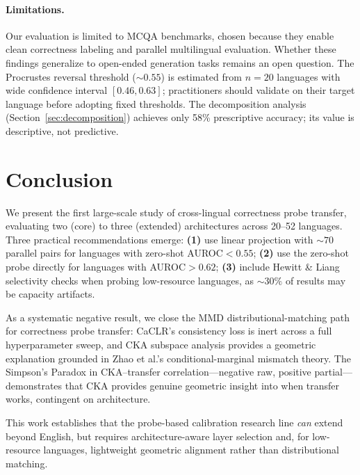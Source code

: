 \documentclass[11pt,a4paper]{article}
\newcommand{\auroc}{AUROC}
\begin{document}
\paragraph{Limitations.}
Our evaluation is limited to MCQA benchmarks, chosen because they enable clean correctness labeling and parallel multilingual evaluation. Whether these findings generalize to open-ended generation tasks remains an open question. The Procrustes reversal threshold (${\sim}0.55$) is estimated from $n=20$ languages with wide confidence interval $[0.46, 0.63]$; practitioners should validate on their target language before adopting fixed thresholds. The decomposition analysis (Section~\ref{sec:decomposition}) achieves only 58\% prescriptive accuracy; its value is descriptive, not predictive.


\section{Conclusion}

We present the first large-scale study of cross-lingual correctness probe transfer, evaluating two (core) to three (extended) architectures across 20--52 languages. Three practical recommendations emerge: \textbf{(1)} use linear projection with ${\sim}70$ parallel pairs for languages with zero-shot \auroc{}$<0.55$; \textbf{(2)} use the zero-shot probe directly for languages with \auroc{}$>0.62$; \textbf{(3)} include Hewitt \& Liang selectivity checks when probing low-resource languages, as ${\sim}30\%$ of results may be capacity artifacts.

As a systematic negative result, we close the MMD distributional-matching path for correctness probe transfer: CaCLR's consistency loss is inert across a full hyperparameter sweep, and CKA subspace analysis provides a geometric explanation grounded in Zhao et al.'s conditional-marginal mismatch theory. The Simpson's Paradox in CKA--transfer correlation---negative raw, positive partial---demonstrates that CKA provides genuine geometric insight into when transfer works, contingent on architecture.

This work establishes that the probe-based calibration research line \emph{can} extend beyond English, but requires architecture-aware layer selection and, for low-resource languages, lightweight geometric alignment rather than distributional matching.
\end{document}
